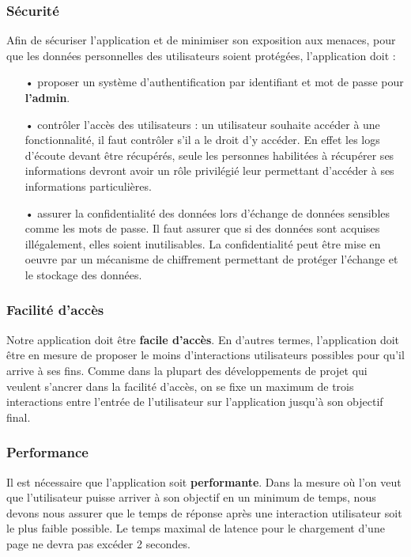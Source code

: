 \documentclass[12pt, openany]{report}
\begin{document}
\subsubsection{Sécurité}
Afin de sécuriser l'application et de minimiser son exposition aux menaces, pour que les données personnelles des utilisateurs soient protégées, l'application doit :
\begin{itemize}
    \item[•] proposer un système d'authentification par identifiant et mot de passe pour \textbf{l'admin}. 

    \item[•] contrôler l'accès des utilisateurs : un utilisateur souhaite accéder à une fonctionnalité, il faut contrôler s'il a le droit d'y accéder. En effet les logs d'écoute devant être récupérés, seule les personnes habilitées à récupérer ses informations devront avoir un rôle privilégié leur permettant d'accéder à ses informations particulières.
    
    \item[•] assurer la confidentialité des données lors d'échange de données sensibles comme les mots de passe. Il faut assurer que si des données sont acquises illégalement, elles soient inutilisables. La confidentialité peut être mise en oeuvre par un mécanisme de chiffrement permettant de protéger l'échange et le stockage des données.

\end{itemize}

\subsubsection{Facilité d'accès}

Notre application doit être \textbf{facile d'accès}. En d'autres termes, l'application doit être en mesure de proposer le moins d'interactions utilisateurs possibles pour qu'il arrive à ses fins. Comme dans la plupart des développements de projet qui veulent s'ancrer dans la facilité d'accès, on se fixe un maximum de trois interactions entre l'entrée de l'utilisateur sur l'application jusqu'à son objectif final.

\subsubsection{Performance}

Il est nécessaire que l'application soit \textbf{performante}. Dans la mesure où l'on veut que l'utilisateur puisse arriver à son objectif en un minimum de temps, nous devons nous assurer que le temps de réponse après une interaction utilisateur soit le plus faible possible. Le temps maximal de latence pour le chargement d'une page ne devra pas excéder 2 secondes. 
\end{document}
